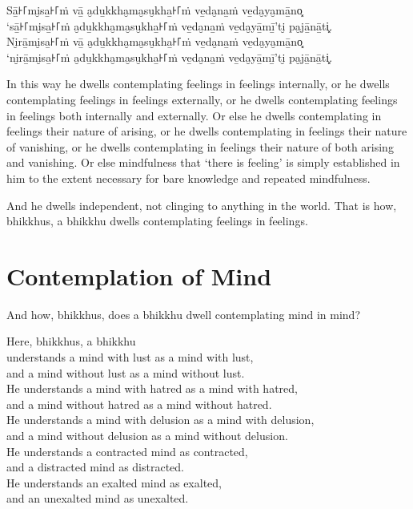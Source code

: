 Sā̱꜔꜒mi̮sa̱꜔꜒ṁ vā̱ a̮du̱kkha̮ma̮su̮kha̱꜔꜒ṁ ve̱da̮na̱ṁ ve̱da̮ya̮mā̱no͓\\
‘sā̱꜔꜒mi̮sa̱꜔꜒ṁ a̮du̱kkha̮ma̮su̮kha̱꜔꜒ṁ ve̱da̮na̱ṁ ve̱da̮yā̱mī̱’ti̮ pa̮jā̱nā̱ti͓.\\
Ni̮rā̱mi̮sa̱꜔꜒ṁ vā̱ a̮du̱kkha̮ma̮su̮kha̱꜔꜒ṁ ve̱da̮na̱ṁ ve̱da̮ya̮mā̱no͓\\
‘ni̮rā̱mi̮sa̱꜔꜒ṁ a̮du̱kkha̮ma̮su̮kha̱꜔꜒ṁ ve̱da̮na̱ṁ ve̱da̮yā̱mī̱’ti̮ pa̮jā̱nā̱ti͓.

\englishPage

In this way he dwells contemplating feelings in feelings internally, or he
dwells contemplating feelings in feelings externally, or he dwells contemplating
feelings in feelings both internally and externally. Or else he dwells
contemplating in feelings their nature of arising, or he dwells contemplating in
feelings their nature of vanishing, or he dwells contemplating in feelings their
nature of both arising and vanishing. Or else mindfulness that ‘there is
feeling’ is simply established in him to the extent necessary for bare knowledge
and repeated mindfulness.

And he dwells independent, not clinging to anything in the world. That is how,
bhikkhus, a bhikkhu dwells contemplating feelings in feelings.


\chapter{Contemplation of Mind}

And how, bhikkhus, does a bhikkhu dwell contemplating mind in mind?

Here, bhikkhus, a bhikkhu\\
understands a mind with lust as a mind with lust,\\
and a mind without lust as a mind without lust.\\
He understands a mind with hatred as a mind with hatred,\\
and a mind without hatred as a mind without hatred.\\
He understands a mind with delusion as a mind with delusion,\\
and a mind without delusion as a mind without delusion.\\
He understands a contracted mind as contracted,\\
and a distracted mind as distracted.\\
He understands an exalted mind as exalted,\\
and an unexalted mind as unexalted.

